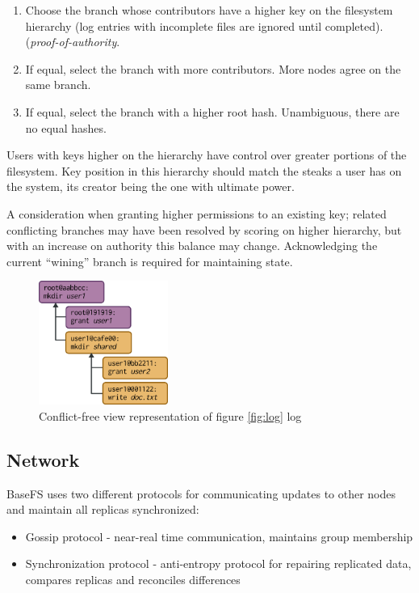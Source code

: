 \documentclass{sig-alternate}
\begin{document}
\begin{enumerate}
\item Choose the branch whose contributors have a higher key on the filesystem hierarchy (log entries with incomplete files are ignored until completed). (\textit{proof-of-authority}.
\item If equal, select the branch with more contributors. More nodes agree on the same branch.
\item If equal, select the branch with a higher root hash. Unambiguous, there are no equal hashes.
\end{enumerate}

Users with keys higher on the hierarchy have control over greater portions of the filesystem. Key position in this hierarchy should match the steaks a user has on the system, its creator being the one with ultimate power.

A consideration when granting higher permissions to an existing key; related conflicting branches may have been resolved by scoring on higher hierarchy, but with an increase on authority this balance may change. Acknowledging the current ``wining'' branch is required for maintaining state.

\begin{figure}
\centering
\includegraphics[width=120pt]{imgs/view.png}
\caption{Conflict-free view representation of figure \ref{fig:log} log}
\label{fig:view}
\end{figure}


\subsection{Network} \label{network}

BaseFS uses two different protocols for communicating updates to other nodes and maintain all replicas synchronized:

\begin{itemize}
    \item Gossip protocol - near-real time communication, maintains group membership
    \item Synchronization protocol - anti-entropy protocol for repairing replicated data, compares replicas and reconciles differences
\end{itemize}
\end{document}
